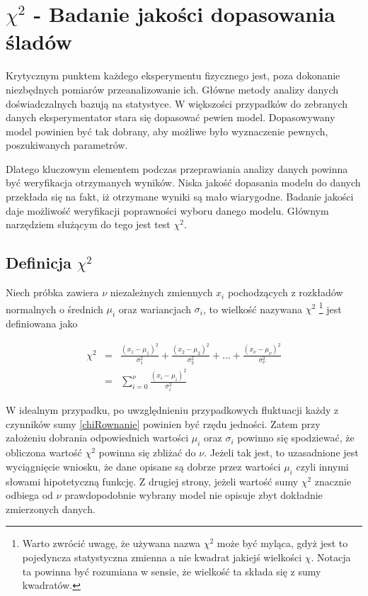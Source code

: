 \chapter{$\chi^2$ - Badanie jakości dopasowania śladów}
Krytycznym punktem każdego eksperymentu fizycznego jest, poza dokonanie niezbędnych pomiarów przeanalizowanie ich. Główne metody analizy danych doświadczalnych bazują na statystyce. W większości przypadków do zebranych danych eksperymentator stara się dopasować pewien model. Dopasowywany model powinien być tak dobrany, aby możliwe było wyznaczenie pewnych, poszukiwanych parametrów. 

Dlatego kluczowym elementem podczas przeprawiania analizy danych powinna być weryfikacja otrzymanych wyników. Niska jakość dopasania modelu do danych przekłada się na fakt, iż otrzymane wyniki są mało wiarygodne. Badanie jakości daje możliwość weryfikacji poprawności wyboru danego modelu. Głównym narzędziem służącym do tego jest test $\chi^2$.


\section{Definicja $\chi^2$}

Niech próbka zawiera $\nu$  niezależnych zmiennych $x_i$  pochodzących z rozkładów normalnych o średnich $\mu_i$ oraz wariancjach $\sigma_i$, to wielkość nazywana $\chi^2$ \footnote{Warto zwrócić uwagę, że używana nazwa $\chi^2$ może być myląca, gdyż jest to pojedyncza statystyczna zmienna a nie kwadrat jakiejś wielkości $\chi$. Notacja ta powinna być rozumiana w sensie, że wielkość ta składa się z sumy kwadratów.} jest definiowana jako

\begin{eqnarray}
\chi^2 &=& \frac{(x_1-\mu_1)^2}{\sigma_1^2}+\frac{(x_2-\mu_2)^2}{\sigma_2^2}+\ldots + \frac{(x_\nu-\mu_\nu)^2}{\sigma_\nu^2} \nonumber \\
&=& \sum_{i=0}^{\nu}\frac{(x_i-\mu_i)^2}{\sigma_i^2}
\label{chiRownanie}
\end{eqnarray}

W idealnym przypadku, po uwzględnieniu przypadkowych fluktuacji każdy z czynników sumy \ref{chiRownanie} powinien być rzędu jedności. Zatem przy założeniu dobrania odpowiednich wartości  $\mu_i$ oraz $\sigma_i$ powinno się spodziewać, że obliczona wartość $\chi^2$ powinna się zbliżać do $\nu$. Jeżeli tak jest, to uzasadnione jest wyciągnięcie wniosku, że dane opisane są dobrze przez wartości $\mu_i$ czyli innymi słowami hipotetyczną funkcję. 
Z drugiej strony, jeżeli wartość sumy $\chi^2$ znacznie odbiega od $\nu$ prawdopodobnie wybrany model nie opisuje zbyt dokładnie zmierzonych danych. 

